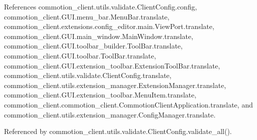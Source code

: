 References commotion\+\_\+client.\+utils.\+validate.\+Client\+Config.\+config, commotion\+\_\+client.\+G\+U\+I.\+menu\+\_\+bar.\+Menu\+Bar.\+translate, commotion\+\_\+client.\+extensions.\+config\+\_\+editor.\+main.\+View\+Port.\+translate, commotion\+\_\+client.\+G\+U\+I.\+main\+\_\+window.\+Main\+Window.\+translate, commotion\+\_\+client.\+G\+U\+I.\+toolbar\+\_\+builder.\+Tool\+Bar.\+translate, commotion\+\_\+client.\+G\+U\+I.\+toolbar.\+Tool\+Bar.\+translate, commotion\+\_\+client.\+G\+U\+I.\+extension\+\_\+toolbar.\+Extension\+Tool\+Bar.\+translate, commotion\+\_\+client.\+utils.\+validate.\+Client\+Config.\+translate, commotion\+\_\+client.\+utils.\+extension\+\_\+manager.\+Extension\+Manager.\+translate, commotion\+\_\+client.\+G\+U\+I.\+extension\+\_\+toolbar.\+Menu\+Item.\+translate, commotion\+\_\+client.\+commotion\+\_\+client.\+Commotion\+Client\+Application.\+translate, and commotion\+\_\+client.\+utils.\+extension\+\_\+manager.\+Config\+Manager.\+translate.



Referenced by commotion\+\_\+client.\+utils.\+validate.\+Client\+Config.\+validate\+\_\+all().


